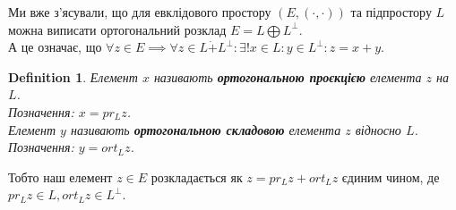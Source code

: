 \documentclass[a4paper, 10pt]{article}
\theoremstyle{theoremdd}
\theoremstyle{theoremdd}
\newtheorem{definition}[theorem]{Definition}
\theoremstyle{theoremdd}
\theoremstyle{theoremdd}
\theoremstyle{theoremdd}
\theoremstyle{theoremdd}
\theoremstyle{theoremdd}
\theoremstyle{theoremdd}
\begin{document}
Ми вже з'ясували, що для евклідового простору $(E,(\cdot,\cdot))$ та підпростору $L$ можна виписати ортогональний розклад $E = L \bigoplus L^\perp$.\\
А це означає, що $\forall z \in E \implies \forall z \in L \dot{+} L^\perp: \exists! x \in L: y \in L^\perp: z = x+y$.

\begin{definition}
Елемент $x$ називають \textbf{ортогональною проєкцією} елемента $z$ на $L$.\\
Позначення: $x = pr_L z$.\\
Елемент $y$ називають \textbf{ортогональною складовою} елемента $z$ відносно $L$.\\
Позначення: $y = ort_L z$.
\end{definition}

Тобто наш елемент $z \in E$ розкладається як $z = pr_L z + ort_L z$ єдиним чином, де $pr_L z \in L, ort_L z \in L^\perp$.
\end{document}
